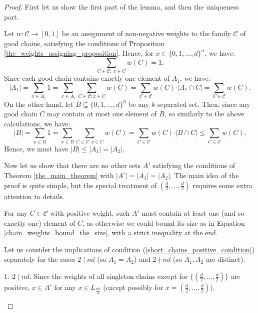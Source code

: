 \documentclass[11pt, reqno]{amsart}
\newenvironment{caseindent}[1][2em]
  {%
    \begin{list}{}{%
      \setlength{\leftmargin}{#1}%
      \setlength{\rightmargin}{0pt}%
      \setlength{\topsep}{0pt}%
      \setlength{\partopsep}{0pt}%
      \setlength{\itemsep}{0pt}%
      \setlength{\parsep}{\parskip}%
      \setlength{\listparindent}{\parindent}%
    }%
    \item[]%
    \let\fullwidthdisplay\relax
    \ignorespaces
  }
  {%
    \end{list}%
    \ignorespacesafterend
  }
\theoremstyle{remark}
\numberwithin{equation}{section}
\newcommand{\thehypercube}{\{0, 1, \ldots, d\}^n}
\newcommand{\thespecialpoint}{(\frac{d}{2}, \ldots, \frac{d}{2})}
\begin{document}
\begin{proof}
    First let us show the first part of the lemma, and then the uniqueness part.

    Let $w: \mathcal{C} \rightarrow [0, 1]$ be an assignment of non-negative weights to the family $\mathcal{C}$ of good chains, satisfying the conditions of Proposition \ref{the_weights_assigning_proposition}. Hence, for $x \in \thehypercube$, we have:
    \begin{equation*}
        \sum_{C \in \mathcal{C}: \ x \in C} w(C) = 1.
    \end{equation*}
    Since each good chain contains exactly one element of $A_1$, we have:
    \begin{equation}
        \vert A_1\vert  = \sum_{x \in A_1} 1 = \sum_{x \in A_1} \sum_{C \in \mathcal{C} : x \in C} w(C) = \sum_{C \in \mathcal{C}} w(C) \cdot \vert A_1 \cap C\vert  = \sum_{C \in \mathcal{C}} w(C).
    \end{equation}
    On the other hand, let $B \subseteq \thehypercube$ be any $k$-separated set. Then, since any good chain $C$ may contain at most one element of $B$, so similarly to the above calculations, we have:
    \begin{equation}
    \label{chain_weights_bound_the_size}
        \vert B\vert  = \sum_{x \in B} 1 = \sum_{x \in B} \sum_{C \in \mathcal{C} : x \in C} w(C) = \sum_{C \in \mathcal{C}} w(C) \cdot \vert B \cap C\vert  \leqslant \sum_{C \in \mathcal{C}} w(C).
    \end{equation}
    Hence, we must have $\vert B\vert  \leqslant \vert A_1\vert =\vert A_2\vert $.

    Now let us show that there are no other sets $A'$ satisfying the conditions of Theorem \ref{the_main_theorem} with $\vert A'\vert =\vert A_1\vert =\vert A_2\vert $. The main idea of the proof is quite simple, but the special treatment of $\thespecialpoint$ requires some extra attention to details.

    For any $C \in \mathcal{C}$ with positive weight, such $A'$ must contain at least one (and so exactly one) element of $C$, as otherwise we could bound its size as in Equation \ref{chain_weights_bound_the_size}, with a strict inequality at the end.

    Let us consider the implications of condition (\ref{short_chains_positive_condition}) separately for the cases $2 \mid nd$ (so $A_1=A_2$) and $2 \nmid nd$ (so $A_1, A_2$ are distinct).

    \begin{caseindent}
    $1: \ 2 \mid nd.$ Since the weights of all singleton chains except for $\{\thespecialpoint\}$ are positive, $x \in A'$ for any $x \in L_{\frac{nd}{2}}$ (except possibly for $x=\thespecialpoint$).


\end{caseindent}
\end{proof}
\end{document}
